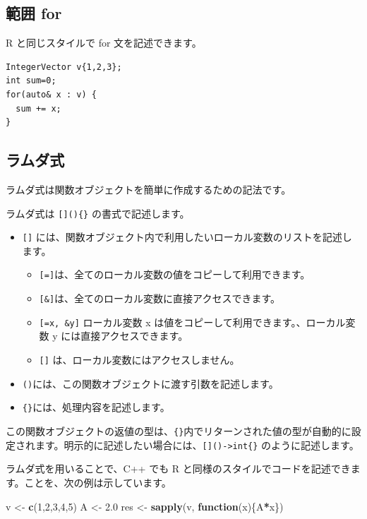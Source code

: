\documentclass[]{book}
\newenvironment{Shaded}{\begin{snugshade}}{\end{snugshade}}
\newcommand{\ControlFlowTok}[1]{\textcolor[rgb]{0.13,0.29,0.53}{\textbf{#1}}}
\newcommand{\DecValTok}[1]{\textcolor[rgb]{0.00,0.00,0.81}{#1}}
\newcommand{\FloatTok}[1]{\textcolor[rgb]{0.00,0.00,0.81}{#1}}
\newcommand{\KeywordTok}[1]{\textcolor[rgb]{0.13,0.29,0.53}{\textbf{#1}}}
\newcommand{\NormalTok}[1]{#1}
\newcommand{\OperatorTok}[1]{\textcolor[rgb]{0.81,0.36,0.00}{\textbf{#1}}}
\newcommand{\StringTok}[1]{\textcolor[rgb]{0.31,0.60,0.02}{#1}}
\providecommand{\tightlist}{%
  \setlength{\itemsep}{0pt}\setlength{\parskip}{0pt}}
\begin{document}
\hypertarget{-for}{%
\subsection{範囲 for}\label{-for}}

R と同じスタイルで for 文を記述できます。

\begin{verbatim}
IntegerVector v{1,2,3};
int sum=0;
for(auto& x : v) {
  sum += x;
}
\end{verbatim}

\subsection{ラムダ式}

ラムダ式は関数オブジェクトを簡単に作成するための記法です。

ラムダ式は \texttt{{[}{]}()\{\}} の書式で記述します。

\begin{itemize}
\tightlist
\item
  \texttt{{[}{]}} には、関数オブジェクト内で利用したいローカル変数のリストを記述します。

  \begin{itemize}
  \tightlist
  \item
    \texttt{{[}={]}}は、全てのローカル変数の値をコピーして利用できます。
  \item
    \texttt{{[}\&{]}}は、全てのローカル変数に直接アクセスできます。
  \item
    \texttt{{[}=x,\ \&y{]}} ローカル変数 x は値をコピーして利用できます。、ローカル変数 y には直接アクセスできます。
  \item
    \texttt{{[}{]}} は、ローカル変数にはアクセスしません。
  \end{itemize}
\item
  \texttt{()}には、この関数オブジェクトに渡す引数を記述します。
\item
  \texttt{\{\}}には、処理内容を記述します。
\end{itemize}

この関数オブジェクトの返値の型は、\texttt{\{\}}内でリターンされた値の型が自動的に設定されます。明示的に記述したい場合には、\texttt{{[}{]}()-\textgreater{}int\{\}} のように記述します。

ラムダ式を用いることで、C++ でも R と同様のスタイルでコードを記述できます。ことを、次の例は示しています。

\begin{Shaded}
\begin{Highlighting}[]
\NormalTok{v <-}\StringTok{ }\KeywordTok{c}\NormalTok{(}\DecValTok{1}\NormalTok{,}\DecValTok{2}\NormalTok{,}\DecValTok{3}\NormalTok{,}\DecValTok{4}\NormalTok{,}\DecValTok{5}\NormalTok{)}
\NormalTok{A <-}\StringTok{ }\FloatTok{2.0}
\NormalTok{res <-}
\StringTok{  }\KeywordTok{sapply}\NormalTok{(v, }\ControlFlowTok{function}\NormalTok{(x)\{A}\OperatorTok{*}\NormalTok{x\})}
\end{Highlighting}
\end{Shaded}
\end{document}
